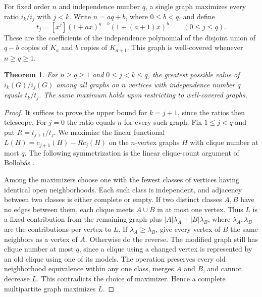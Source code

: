 \documentclass[11pt,a4paper]{article}
\newtheorem{theorem}{Theorem}[section]
\begin{document}
For fixed order $n$ and independence number $q$, a single graph
maximizes every ratio $i_k/i_j$ with $j<k$. Write $n=aq+b$, where
$0\le b<q$, and define
\[
 t_j=[x^j](1+ax)^{q-b}(1+(a+1)x)^b\qquad(0\le j\le q).
\]
These are the coefficients of the independence polynomial of the disjoint
union of $q-b$ copies of $K_a$ and $b$ copies of $K_{a+1}$. This graph
is well-covered whenever $n\ge q\ge1$.

\begin{theorem}\label{thm:sharp-order-ratio}
For $n\ge q\ge1$ and $0\le j<k\le q$, the greatest possible value of
$i_k(G)/i_j(G)$ among all graphs on $n$ vertices with independence
number $q$ equals $t_k/t_j$. The same maximum holds upon restricting
to well-covered graphs.
\end{theorem}
\begin{proof}
It suffices to prove the upper bound for $k=j+1$, since the ratios
then telescope. For $j=0$ the ratio equals $n$ for every such graph.
Fix $1\le j<q$ and put $R=t_{j+1}/t_j$. We maximize the linear
functional $L(H)=c_{j+1}(H)-R c_j(H)$ on the $n$-vertex graphs $H$
with clique number at most $q$. The following symmetrization is the
linear clique-count argument of Bollob\'as \cite{bollobascliques}.

Among the maximizers choose one with the fewest classes of vertices
having identical open neighborhoods. Each such class is independent,
and adjacency between two classes is either complete or empty. If two
distinct classes $A,B$ have no edges between them, each clique meets
$A\cup B$ in at most one vertex. Thus $L$ is a fixed contribution
from the remaining graph plus $|A|\lambda_A+|B|\lambda_B$, where
$\lambda_A,\lambda_B$ are the contributions per vertex to $L$.
If $\lambda_A\ge\lambda_B$, give every vertex of $B$ the same neighbors
as a vertex of $A$. Otherwise do the reverse. The modified graph still
has clique number at most $q$, since a clique using a changed vertex
is represented by an old clique using one of its models. The operation
preserves every old neighborhood equivalence within any one class,
merges $A$ and $B$, and cannot decrease $L$. This contradicts the
choice of maximizer. Hence a complete multipartite graph maximizes $L$.


\end{proof}
\end{document}
